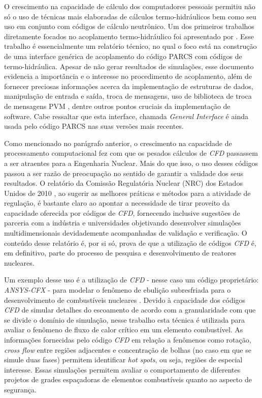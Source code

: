 O crescimento na capacidade de cálculo dos computadores pessoais permitiu não só o uso 
de técnicas mais elaboradas de cálculos termo-hidráulicos bem como seu uso em conjunto 
com códigos de cálculo neutrônico. Um dos primeiros trabalhos diretamente focados no 
acoplamento termo-hidráulico foi apresentado por \cite{Barber98}. Esse trabalho 
é essencialmente um relatório técnico, no qual o foco está na construção de uma interface 
genérica de acoplamento do código PARCS com códigos de termo-hidráulica. Apesar de não 
gerar resultados de simulações, esse documento evidencia a importância e o interesse 
no procedimento de acoplamento, além de fornecer preciosas informações acerca da 
implementação de estruturas de dados, manipulação de entrada e saída, troca de mensagens, 
uso de biblioteca de troca de mensagens PVM \cite{Geist94}, dentre outros pontos cruciais
da implementação de software. Cabe ressaltar que esta interface, 
chamada \textit{General Interface} é ainda usada pelo código PARCS nas suas versões mais 
recentes. 

Como mencionado no parágrafo anterior, o crescimento na capacidade de processamento
computacional 
fez com que os pesados cálculos de \textit{CFD} passassem a ser atraentes 
para a Engenharia Nuclear. Mais do que isso, o uso desses códigos passou a ser razão 
de preocupação no sentido de garantir a validade dos seus resultados. O relatório 
da Comissão Regulatória Nuclear (NRC) dos Estados Unidos de 2010 \cite[p.69]{NUREG2010}, 
ao sugerir as melhores práticas e métodos para a atividade de regulação, é bastante claro 
ao apontar a necessidade de tirar proveito da capacidade oferecida por códigos de \textit{CFD}, 
fornecendo inclusive sugestões de parceria com a indústria e universidades objetivando 
desenvolver simulações multidimensionais devidademente acompanhadas de validação e
verificação. O conteúdo desse relatório é, por si só, prova de que a utilização de 
códigos \textit{CFD} é, em definitivo, parte do processo de 
pesquisa e desenvolvimento de reatores nucleares. 

Um exemplo desse uso é a utilização de \textit{CFD} - nesse caso um código proprietário: 
\textit{ANSYS-CFX} - para modelar o fenômeno de ebulição subresfriada para o 
desenvolvimento de combustíveis nucleares \cite{Krepper2007}. Devido à capacidade 
dos códigos \textit{CFD} de simular detalhes do escoamento de acordo com a granularidade com que se
divide o domínio de simulação, nesse trabalho esta técnica é utilizada para avaliar 
o fenômeno de fluxo de calor crítico em um elemento combustível. As informações 
fornecidas pelo código \textit{CFD} em relação a fenômenos como rotação, \textit{cross flow} entre 
regiões adjacentes e concentração de bolhas (no caso em que se simule duas fases)
permitem identificar \textit{hot spots}, ou seja, regiões de especial interesse.
Essas simulações permitem avaliar o comportamento
de diferentes projetos de grades espaçadoras de elementos combustíveis quanto ao aspecto 
de segurança.

